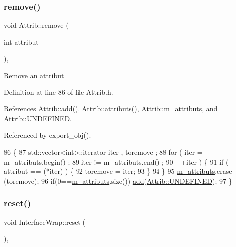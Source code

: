 \subsubsection{\texorpdfstring{remove()}{remove()}}
{\footnotesize\ttfamily void Attrib\+::remove (\begin{DoxyParamCaption}\item[{int}]{attribut }\end{DoxyParamCaption})\hspace{0.3cm}{\ttfamily [inline]}, {\ttfamily [inherited]}}

Remove an attribut 

Definition at line 86 of file Attrib.\+h.



References Attrib\+::add(), Attrib\+::attributs(), Attrib\+::m\+\_\+attributs, and Attrib\+::\+U\+N\+D\+E\+F\+I\+N\+ED.



Referenced by export\+\_\+obj().


\begin{DoxyCode}
86                                \{
87     std::vector<int>::iterator iter , toremove ;
88     \textcolor{keywordflow}{for} ( iter  = \hyperlink{classAttrib_ac4bd58a0cc6b38a3b711d609a3d3aacc}{m\_attributs}.begin() ;
89           iter != \hyperlink{classAttrib_ac4bd58a0cc6b38a3b711d609a3d3aacc}{m\_attributs}.end()   ;
90           ++iter ) \{
91       \textcolor{keywordflow}{if} ( attribut == (*iter) ) \{
92         toremove = iter;
93       \}
94     \}
95     \hyperlink{classAttrib_ac4bd58a0cc6b38a3b711d609a3d3aacc}{m\_attributs}.erase (toremove);
96     \textcolor{keywordflow}{if}(0==\hyperlink{classAttrib_ac4bd58a0cc6b38a3b711d609a3d3aacc}{m\_attributs}.size()) \hyperlink{classAttrib_a235f773af19c900264a190b00a3b4ad7}{add}(\hyperlink{classAttrib_a69e171d7cc6417835a5a306d3c764235a3a8da2ab97dda18aebab196fe4100531}{Attrib::UNDEFINED});
97   \}
\end{DoxyCode}
\mbox{\label{structInterfaceWrap_a6c350b2f44c579187e6e4269cae29bae}} 
\subsubsection{\texorpdfstring{reset()}{reset()}}
{\footnotesize\ttfamily void Interface\+Wrap\+::reset (\begin{DoxyParamCaption}{ }\end{DoxyParamCaption})\hspace{0.3cm}{\ttfamily [inline]}, {\ttfamily [virtual]}}

